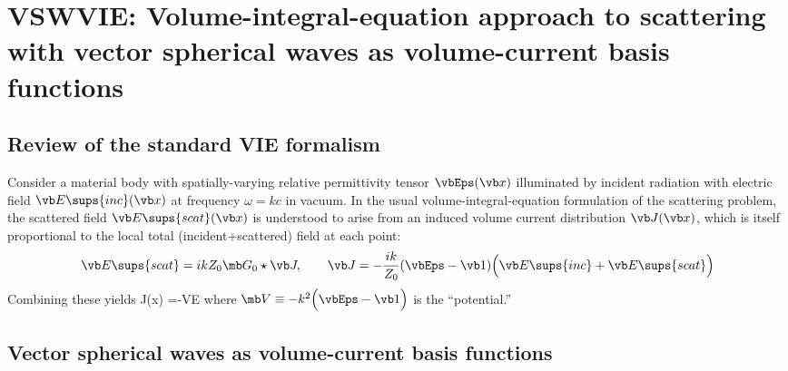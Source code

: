 \documentclass[letterpaper]{article}
\begin{document}
\newpage
\section{VSWVIE: Volume-integral-equation approach to scattering with vector spherical waves as volume-current basis functions}

\subsection{Review of the standard VIE formalism}

Consider a material body with
spatially-varying relative permittivity tensor $\vbEps(\vb x)$
illuminated by incident radiation with
electric field $\vb E\sups{inc}(\vb x)$
at frequency $\omega=kc$ in vacuum.
In the usual volume-integral-equation formulation of the
scattering problem, the scattered field $\vb E\sups{scat}(\vb x)$
is understood to arise from an induced volume current
distribution $\vb J(\vb x)$, which is itself proportional
to the local total (incident+scattered) field at each 
point:
$$
 \vb E\sups{scat} = ikZ_0 \mb G_0 \star \vb J,
 \qquad
 \vb J=-\frac{ik}{Z_0}(\vbEps-\vb 1)
         \Big(\vb E\sups{inc} + \vb E\sups{scat}\Big)
$$
Combining these yields
{\Big[ \vb 1 + \mb V \mb G\Big]
\vb J(\vb x) =-\mb V\vb E
}
where $\mb V\equiv -k^2 \Big(\vbEps-\vb 1\Big)$ is the
``potential.''
 
\subsection{Vector spherical waves as volume-current basis functions}
\end{document}
